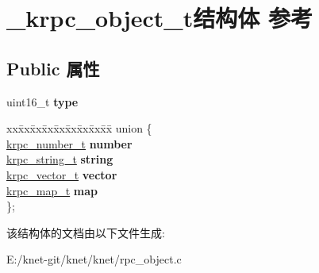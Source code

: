 \hypertarget{struct__krpc__object__t}{}\section{\+\_\+krpc\+\_\+object\+\_\+t结构体 参考}
\label{struct__krpc__object__t}
\subsection*{Public 属性}
\begin{DoxyCompactItemize}
\item 
\hypertarget{struct__krpc__object__t_a9a653a7c20ecbff327b34b3461b587bd}{}uint16\+\_\+t {\bfseries type}\label{struct__krpc__object__t_a9a653a7c20ecbff327b34b3461b587bd}

\item 
\hypertarget{struct__krpc__object__t_af2b8d2156ade9c154feae01fdd002bfa}{}\begin{tabbing}
xx\=xx\=xx\=xx\=xx\=xx\=xx\=xx\=xx\=\kill
union \{\\
\>\hyperlink{struct__krpc__number__t}{krpc\_number\_t} {\bfseries number}\\
\>\hyperlink{struct__krpc__string__t}{krpc\_string\_t} {\bfseries string}\\
\>\hyperlink{struct__krpc__vector__t}{krpc\_vector\_t} {\bfseries vector}\\
\>\hyperlink{struct__krpc__map__t}{krpc\_map\_t} {\bfseries map}\\
\}; \label{struct__krpc__object__t_af2b8d2156ade9c154feae01fdd002bfa}
\\

\end{tabbing}\end{DoxyCompactItemize}


该结构体的文档由以下文件生成\+:\begin{DoxyCompactItemize}
\item 
E\+:/knet-\/git/knet/knet/rpc\+\_\+object.\+c\end{DoxyCompactItemize}
